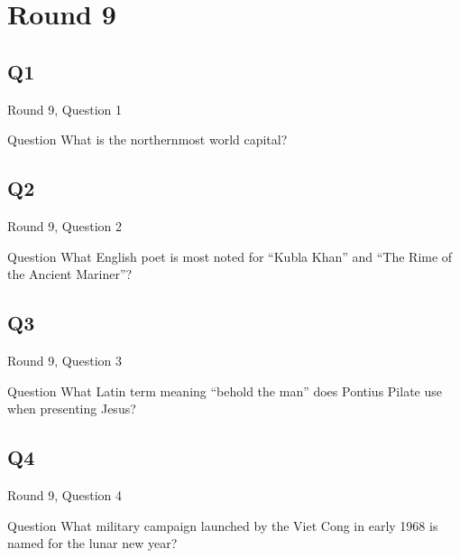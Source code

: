 \documentclass[11pt]{beamer}
\begin{document}
\section{Round 9}
    

\subsection*{Q1}
\begin{frame}[t]{Round 9, Question 1}
\vspace{2em}
\begin{block}{Question}
What is the northernmost world capital\@?
\end{block}
\end{frame}
    

\subsection*{Q2}
\begin{frame}[t]{Round 9, Question 2}
\vspace{2em}
\begin{block}{Question}
What English poet is most noted for ``Kubla Khan'' and ``The Rime of the Ancient Mariner''\@?
\end{block}
\end{frame}
    

\subsection*{Q3}
\begin{frame}[t]{Round 9, Question 3}
\vspace{2em}
\begin{block}{Question}
What Latin term meaning ``behold the man'' does Pontius Pilate use when presenting Jesus\@?
\end{block}
\end{frame}
    

\subsection*{Q4}
\begin{frame}[t]{Round 9, Question 4}
\vspace{2em}
\begin{block}{Question}
What military campaign launched by the Viet Cong in early 1968 is named for the lunar new year\@?
\end{block}
\end{frame}
    
\end{document}
